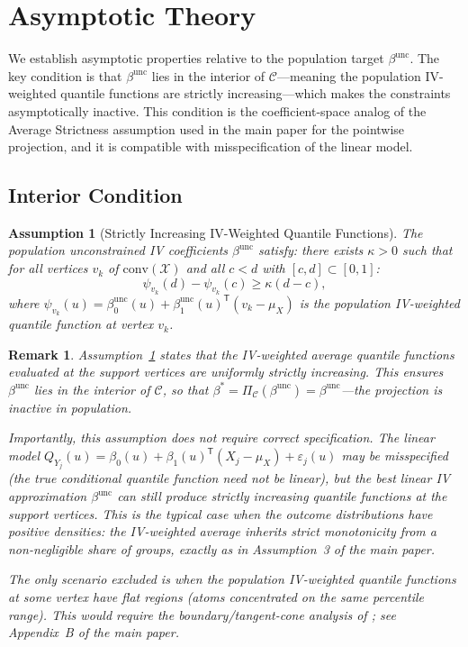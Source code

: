 \documentclass[12pt]{article}
\newcommand{\T}{\mathsf{T}}
\newtheorem{assumption}{Assumption}
\newtheorem{remark}{Remark}
\begin{document}
\section{Asymptotic Theory}

We establish asymptotic properties relative to the population target $\beta^{\text{unc}}$. The key condition is that $\beta^{\text{unc}}$ lies in the interior of $\mathcal{C}$---meaning the population IV-weighted quantile functions are strictly increasing---which makes the constraints asymptotically inactive. This condition is the coefficient-space analog of the Average Strictness assumption used in the main paper for the pointwise projection, and it is compatible with misspecification of the linear model.

\subsection{Interior Condition}

\begin{assumption}[Strictly Increasing IV-Weighted Quantile Functions]\label{ass:endpoint_strict}
The population unconstrained IV coefficients $\beta^{\text{unc}}$ satisfy: there exists $\kappa > 0$ such that for all vertices $v_k$ of $\text{conv}(\mathcal{X})$ and all $c < d$ with $[c,d] \subset [0,1]$:
\begin{equation}
\psi_{v_k}(d) - \psi_{v_k}(c) \geq \kappa(d-c),
\end{equation}
where $\psi_{v_k}(u) = \beta_0^{\text{unc}}(u) + \beta_1^{\text{unc}}(u)^\T(v_k - \mu_X)$ is the population IV-weighted quantile function at vertex $v_k$.
\end{assumption}

\begin{remark}
Assumption~\ref{ass:endpoint_strict} states that the IV-weighted average quantile functions evaluated at the support vertices are uniformly strictly increasing. This ensures $\beta^{\text{unc}}$ lies in the \emph{interior} of $\mathcal{C}$, so that $\beta^* = \Pi_{\mathcal{C}}(\beta^{\text{unc}}) = \beta^{\text{unc}}$---the projection is inactive in population.

Importantly, this assumption \emph{does not require correct specification}. The linear model $Q_{Y_j}(u) = \beta_0(u) + \beta_1(u)^\T(X_j - \mu_X) + \varepsilon_j(u)$ may be misspecified (the true conditional quantile function need not be linear), but the best linear IV approximation $\beta^{\text{unc}}$ can still produce strictly increasing quantile functions at the support vertices. This is the typical case when the outcome distributions have positive densities: the IV-weighted average inherits strict monotonicity from a non-negligible share of groups, exactly as in Assumption~3 of the main paper.

The only scenario excluded is when the population IV-weighted quantile functions at some vertex have flat regions (atoms concentrated on the same percentile range). This would require the boundary/tangent-cone analysis of \cite{fang2018inference}; see Appendix~B of the main paper.
\end{remark}
\end{document}
